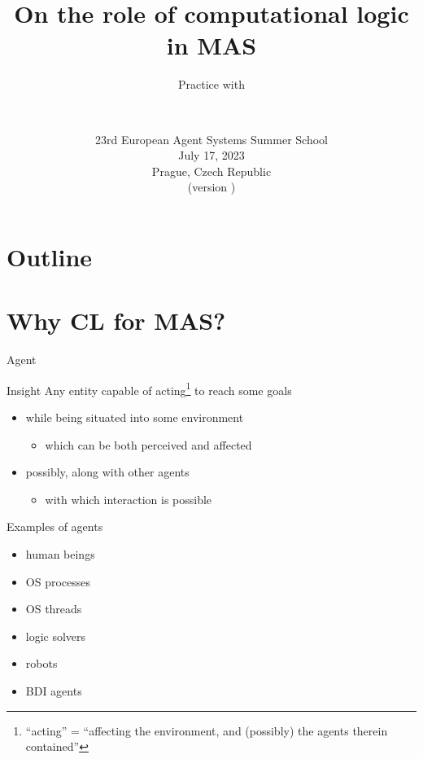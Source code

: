 \documentclass[presentation]{beamer}\mode<presentation>{\usetheme{AMSBolognaFC}}
\title[CL in MAS]{On the role of computational logic in MAS}
\subtitle{Practice with \twopkt}
\author[\sspeaker{\gcShort}]{\speaker{\gcFull} \\ \gcEmail}
\institute[\disiShort, \uniboShort]{\disi{} (\disiShort)\\\unibo}
\date[EASS 2023 (v.\ \version)]{
    23rd European Agent Systems Summer School
    \\
    July 17, 2023
    \\
    Prague, Czech Republic
    \\
    (version \version)
}
\begin{document}

\frame{\titlepage}

\section*{Outline}
%
\frame[c]{\tableofcontents[hideallsubsections]}

\section{Why CL for MAS?}

\begin{frame}[c]{Agent}
%
\begin{block}{Insight}
    Any entity capable of \alert{acting}\footnote{``acting'' = ``affecting the environment, and (possibly) the agents therein contained''}
    to reach some \alert{goals}
    \begin{itemize}
        \item while being situated into some \alert{environment}
        \begin{itemize}
            \item which can be both \alert{perceived} and \alert{affected}
        \end{itemize}

        \item possibly, along with other agents
        \begin{itemize}
            \item with which \alert{interaction} is possible
        \end{itemize}
    \end{itemize}
\end{block}
%
\begin{exampleblock}{Examples of agents}
    \begin{multicols}{2}
        \begin{itemize}
            \item human beings
            \item OS processes
            \item OS threads
            \item logic solvers
            \item robots
            \item BDI agents
        \end{itemize}
    \end{multicols}
\end{exampleblock}
%
\end{frame}
\end{document}
